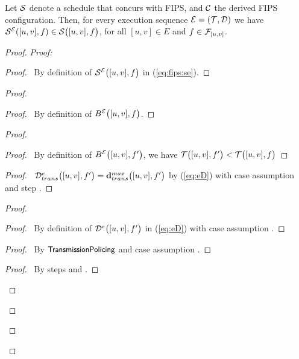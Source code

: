 \begin{lemma}\label{lemma:fips:aux}
  Let $\S{}$ denote a schedule that concurs with FIPS, and $\mathcal{C}$ the derived FIPS configuration. 
  Then, for every execution sequence $\E = (\T{}, \D{})$ we have $\S{}^\E([u,v],f) \in \S{[u,v],f}$, for all $[u,v] \in E$ and $f \in \mathcal{F}_{[u,v]}$.
\end{lemma}
\begin{proof}
    \textit{Proof:}
    \begin{proof}
      \pf\ By definition of $\SE{[u,v],f}$ in (\ref{eq:fips:se}).
    \end{proof}
    \begin{proof}
	\begin{proof}
	    \pf\ By definition of $\IE{[u,v], f}$.
	\end{proof}
	\begin{proof}
	    \begin{proof}
		\pf\ By definition of $\IE{[u,v], f'}$, we have $\T{[u,v], f'} < \T{[u,v], f}$
	    \end{proof}
	    \begin{proof}
		\pf\ $\eDtrans{[u,v],f'} = \dpdbtransmax{[u,v], f'}$ by (\ref{eq:eD}) with case assumption  and step .
	    \end{proof}
	    \begin{proof}
		\begin{proof}
		    \pf\ By definition of $\eD{[u,v],f'}$ in (\ref{eq:eD}) with case assumption .
		\end{proof}
		\begin{proof}
		    \pf\ By $\textsf{\small TransmissionPolicing}$ and case assumption .
		\end{proof}
		\qedstep
		\begin{proof}
		    \pf\ By steps  and .
		\end{proof}
	    \end{proof}

\end{proof}
\end{proof}
\end{proof}
